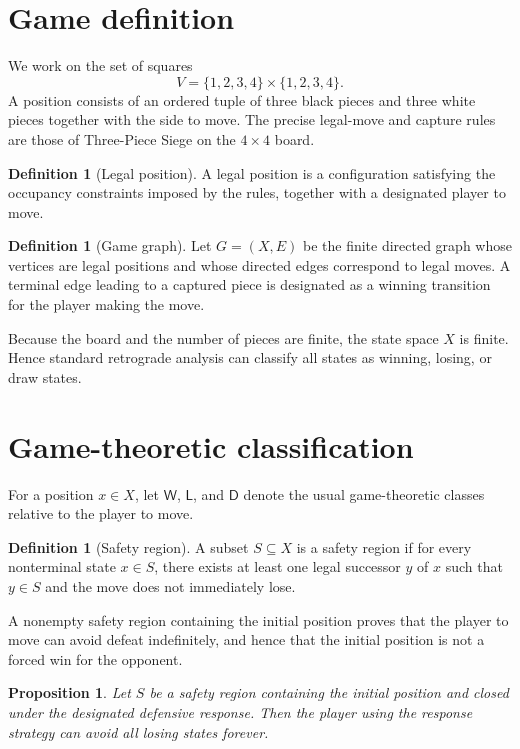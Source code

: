 \documentclass[11pt,a4paper]{article}
\theoremstyle{plain}
\newtheorem{proposition}[theorem]{Proposition}
\theoremstyle{definition}
\newtheorem{definition}[theorem]{Definition}
\newcommand{\Win}{\mathsf{W}}
\newcommand{\Draw}{\mathsf{D}}
\newcommand{\Lose}{\mathsf{L}}
\begin{document}
\section{Game definition}

We work on the set of squares
\[
V=\{1,2,3,4\}\times\{1,2,3,4\}.
\]
A position consists of an ordered tuple of three black pieces and three white pieces together with the side to move. The precise legal-move and capture rules are those of Three-Piece Siege on the $4\times4$ board.

\begin{definition}[Legal position]
A legal position is a configuration satisfying the occupancy constraints imposed by the rules, together with a designated player to move.
\end{definition}

\begin{definition}[Game graph]
Let $G=(X,E)$ be the finite directed graph whose vertices are legal positions and whose directed edges correspond to legal moves. A terminal edge leading to a captured piece is designated as a winning transition for the player making the move.
\end{definition}

Because the board and the number of pieces are finite, the state space $X$ is finite. Hence standard retrograde analysis can classify all states as winning, losing, or draw states.

\section{Game-theoretic classification}

For a position $x\in X$, let $\Win$, $\Lose$, and $\Draw$ denote the usual game-theoretic classes relative to the player to move.

\begin{definition}[Safety region]
A subset $S\subseteq X$ is a safety region if for every nonterminal state $x\in S$, there exists at least one legal successor $y$ of $x$ such that $y\in S$ and the move does not immediately lose.
\end{definition}

A nonempty safety region containing the initial position proves that the player to move can avoid defeat indefinitely, and hence that the initial position is not a forced win for the opponent.

\begin{proposition}
Let $S$ be a safety region containing the initial position and closed under the designated defensive response. Then the player using the response strategy can avoid all losing states forever.
\end{proposition}
\end{document}
